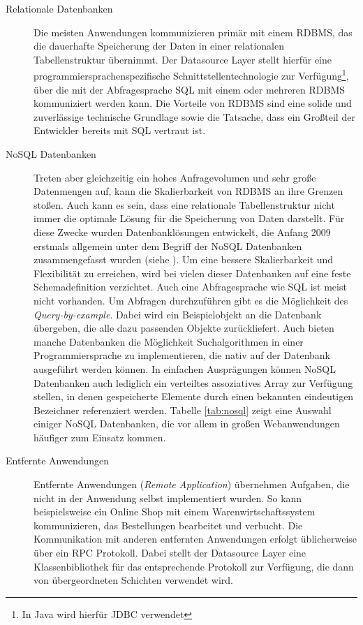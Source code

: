 \begin{description}
\item[Relationale Datenbanken] Die meisten Anwendungen kommunizieren primär mit
einem \ac{RDBMS}, das die dauerhafte Speicherung der Daten in einer relationalen
Tabellenstruktur übernimmt. Der Datasource Layer stellt hierfür eine
programmiersprachenspezifische Schnittstellentechnologie zur
Verfügung\footnote{In Java wird hierfür JDBC verwendet}, über die mit der
Abfragesprache \ac{SQL} mit einem oder mehreren \ac{RDBMS} kommuniziert werden
kann. Die Vorteile von \ac{RDBMS} sind eine solide und zuverlässige technische
Grundlage sowie die Tatsache, dass ein Großteil der Entwickler bereits mit
\ac{SQL} vertraut ist.
\item[NoSQL Datenbanken] Treten aber gleichzeitig ein hohes Anfragevolumen und
sehr große Datenmengen auf, kann die Skalierbarkeit von \ac{RDBMS} an ihre
Grenzen stoßen. Auch kann es sein, dass eine relationale Tabellenstruktur nicht
immer die optimale Lösung für die Speicherung von Daten darstellt. Für diese
Zwecke wurden Datenbanklösungen entwickelt, die Anfang 2009 erstmals allgemein
unter dem Begriff der NoSQL Datenbanken zusammengefasst wurden (siehe
\cite{wiki:nosql}). Um eine bessere Skalierbarkeit und Flexibilität zu
erreichen, wird bei vielen dieser Datenbanken auf eine feste Schemadefinition verzichtet.
Auch eine Abfragesprache wie \ac{SQL} ist meist nicht vorhanden. Um Abfragen
durchzuführen gibt es die Möglichkeit des \emph{Query-by-example}. Dabei wird ein
Beispielobjekt an die Datenbank übergeben, die alle dazu passenden Objekte
zurückliefert. Auch bieten manche Datenbanken die Möglichkeit Suchalgorithmen in
einer Programmiersprache zu implementieren, die nativ auf der Datenbank
ausgeführt werden können. In einfachen Ausprägungen können NoSQL Datenbanken
auch lediglich ein verteiltes assoziatives Array zur Verfügung stellen, in denen
gespeicherte Elemente durch einen bekannten eindeutigen Bezeichner referenziert
werden. Tabelle \ref{tab:nosql} zeigt eine Auswahl einiger NoSQL Datenbanken, die
vor allem in großen Webanwendungen häufiger zum Einsatz kommen.
\item[Entfernte Anwendungen] Entfernte Anwendungen (\emph{Remote
Application}) übernehmen Aufgaben, die nicht in der Anwendung selbst
implementiert wurden. So kann beispielsweise ein Online Shop mit einem
Warenwirtschaftssystem kommunizieren, das Bestellungen bearbeitet und verbucht.
Die Kommunikation mit anderen entfernten Anwendungen erfolgt üblicherweise über
ein \ac{RPC} Protokoll. Dabei stellt der Datasource Layer eine Klassenbibliothek
für das entsprechende Protokoll zur Verfügung, die dann von übergeordneten Schichten
verwendet wird.
\end{description}


